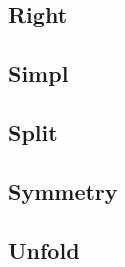 \subsection{Right}

\subsection{Simpl}

\subsection{Split}

\subsection{Symmetry}

\subsection{Unfold}

